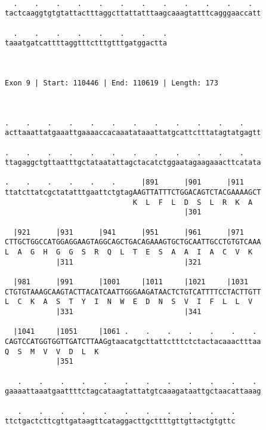 \documentclass{article}
\begin{document}
\begin{Verbatim}
  
  .    .    .    .    .    .    .    .    .    .    .    .  
tactcaaggtgtgtattactttaggcttattatttaagcaaagtatttcagggaaccatt
                                                            
  .    .    .    .    .    .    .    .
taaatgatcattttaggtttctttgtttgatggactta
                                      
                                      
 
Exon 9 | Start: 110446 | End: 110619 | Length: 173



.    .    .    .    .    .    .    .    .    .    .    .    
acttaaattatgaaattgaaaaccacaaatataaattatgcattctttatagtatgagtt
                                                            
.    .    .    .    .    .    .    .    .    .    .    .    
ttagaggctgttaatttgctataatattagctacatctggaatagaagaaacttcatata
                                                            
.    .    .    .    .    .      |891      |901      |911    
ttatcttatcgctatatttgaattctgtagAAGTTATTTCTGGACAGTCTACGAAAAGCT
                              K  L  F  L  D  S  L  R  K  A  
                                          |301              
  
  |921      |931      |941      |951      |961      |971    
CTTGCTGGCCATGGAGGAAGTAGGCAGCTGACAGAAAGTGCTGCAATTGCCTGTGTCAAA
L  A  G  H  G  G  S  R  Q  L  T  E  S  A  A  I  A  C  V  K  
            |311                          |321              
  
  |981      |991      |1001     |1011     |1021     |1031   
CTGTGTAAAGCAAGTACTTACATCAATTGGGAAGATAACTCTGTCATTTTCCTACTTGTT
L  C  K  A  S  T  Y  I  N  W  E  D  N  S  V  I  F  L  L  V  
            |331                          |341              
  
  |1041     |1051     |1061 .    .    .    .    .    .    . 
CAGTCCATGGTGGTTGATCTTAAGgtaacatgcttattctttctctactacaaactttaa
Q  S  M  V  V  D  L  K                                      
            |351                                            
  
   .    .    .    .    .    .    .    .    .    .    .    . 
gaaaattaaatgaattttctagcataagtattatgtcaaagataattgctaacattaaag
                                                            
   .    .    .    .    .    .    .    .    .    .    .
ttctgactcttcgttgataagttcataggacttgcttttgttgttactgtgttc
                                                      

\end{Verbatim}
\end{document}
